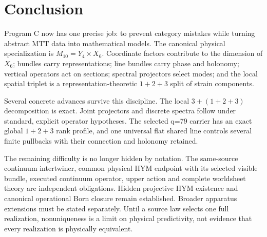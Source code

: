 \documentclass[11pt]{article}
\begin{document}
\section{Conclusion}

Program C now has one precise job: to prevent category mistakes while turning
abstract MTT data into mathematical models.  The canonical physical
specialization is $M_{10}=Y_4\times X_6$.  Coordinate factors contribute to
the dimension of $X_6$; bundles carry representations; line bundles carry
phase and holonomy; vertical operators act on sections; spectral projectors
select modes; and the local spatial triplet is a representation-theoretic
$1+2+3$ split of strain components.

Several concrete advances survive this discipline.  The local
$3+(1+2+3)$ decomposition is exact.  Joint projectors and discrete spectra
follow under standard, explicit operator hypotheses.  The selected q=79
carrier has an exact global $1+2+3$ rank profile, and one universal flat
shared line controls several finite pullbacks with their connection and
holonomy retained.

The remaining difficulty is no longer hidden by notation. The same-source
continuum intertwiner, common physical HYM endpoint with its selected
visible bundle, executed continuum operator, upper action and complete
worldsheet theory are independent obligations. Hidden projective HYM
existence and canonical operational Born closure remain established.
Broader apparatus extensions must be stated separately. Until a source
law selects one full realization,
nonuniqueness is a limit on physical predictivity, not evidence that every
realization is physically equivalent.
\end{document}
